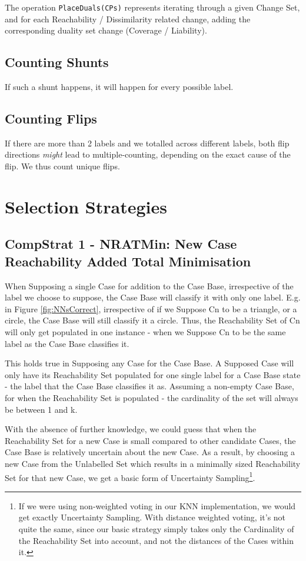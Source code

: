 \documentclass[a4paper,11pt]{report}
\begin{document}
The operation \verb!PlaceDuals(CPs)! represents iterating through a given Change Set, and for each Reachability / Dissimilarity related change, adding the corresponding duality set change (Coverage / Liability).

\subsection{Counting Shunts}
If such a shunt happens, it will happen for every possible label.

\subsection{Counting Flips}
If there are more than 2 labels and we totalled across different labels, both flip directions \emph{might} lead to multiple-counting, depending on the exact cause of the flip. We thus count unique flips.

\section{Selection Strategies}
\subsection{CompStrat 1 - NRATMin: New Case Reachability Added Total Minimisation\label{sec:compstrat1}}
When Supposing a single Case for addition to the Case Base, irrespective of the label we choose to suppose, the Case Base will classify it with only one label. E.g. in Figure \ref{fig:NNsCorrect}, irrespective of if we Suppose Cn to be a triangle, or a circle, the Case Base will still classify it a circle. Thus, the Reachability Set of Cn will only get populated in one instance - when we Suppose Cn to be the same label as the Case Base classifies it.

This holds true in Supposing any Case for the Case Base. A Supposed Case will only have its Reachability Set populated for one single label for a Case Base state - the label that the Case Base classifies it as. Assuming a non-empty Case Base, for when the Reachability Set is populated - the cardinality of the set will always be between 1 and k.

With the absence of further knowledge, we could guess that when the Reachability Set for a new Case is small compared to other candidate Cases, the Case Base is relatively uncertain about the new Case. As a result, by choosing a new Case from the Unlabelled Set which results in a minimally sized Reachability Set for that new Case, we get a basic form of Uncertainty Sampling\footnote{If we were using non-weighted voting in our KNN implementation, we would get exactly Uncertainty Sampling. With distance weighted voting, it's not quite the same, since our basic strategy simply takes only the Cardinality of the Reachability Set into account, and not the distances of the Cases within it.}.
\end{document}
